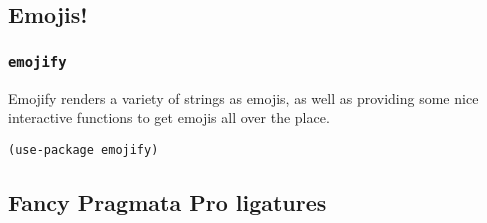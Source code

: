 \documentclass[11pt]{article}
\begin{document}
\subsection{Emojis!}
\label{sec:org327bed2}
\subsubsection{\texttt{emojify}}
\label{sec:org2763a44}
Emojify renders a variety of strings as emojis, as well as providing
some nice interactive functions to get emojis all over the place.

\begin{verbatim}
(use-package emojify)
\end{verbatim}
\subsection{Fancy Pragmata Pro ligatures}
\label{sec:org516031a}
\end{document}
